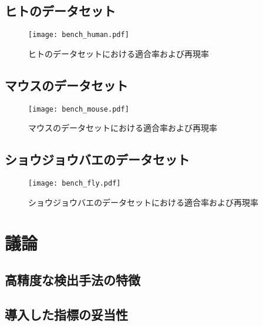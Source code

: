 \subsection{ヒトのデータセット}
\begin{figure}[htbp]
	\begin{center}
		\texttt{[image: bench\_human.pdf]}
	\end{center}
	\caption{ヒトのデータセットにおける適合率および再現率}
	\label{fig:human_pr}
\end{figure}

\subsection{マウスのデータセット}
\begin{figure}[htbp]
	\begin{center}
		\texttt{[image: bench\_mouse.pdf]}
	\end{center}
	\caption{マウスのデータセットにおける適合率および再現率}
	\label{fig:mouse_pr}
\end{figure}

\subsection{ショウジョウバエのデータセット}
\begin{figure}[htbp]
	\begin{center}
		\texttt{[image: bench\_fly.pdf]}
	\end{center}
	\caption{ショウジョウバエのデータセットにおける適合率および再現率}
	\label{fig:fly_pr}
\end{figure}


\section{議論}
\subsection{高精度な検出手法の特徴}
\subsection{導入した指標の妥当性}
